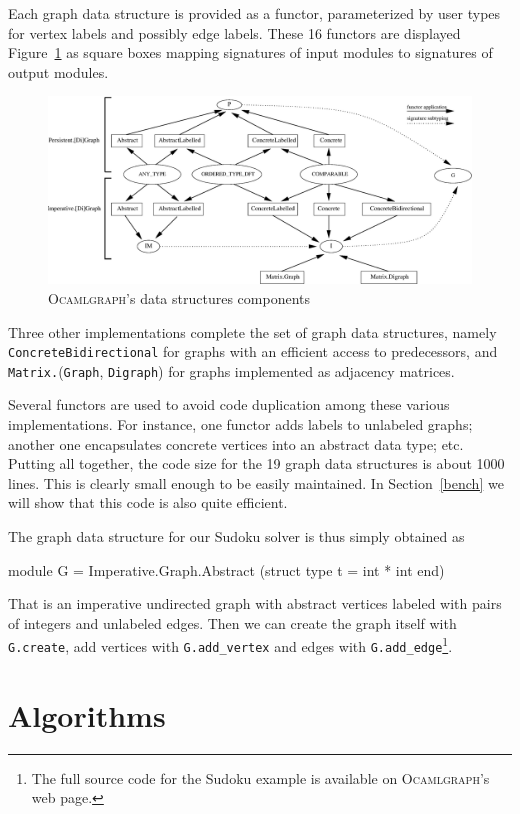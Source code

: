 \documentclass[tfpsymp]{tfp05symp}
\newcommand{\ocamlgraph}{\textsc{Ocamlgraph}\xspace}
\begin{document}
Each graph data structure is provided as a
functor, parameterized by user types for vertex labels and possibly edge
labels. These 16 
functors are displayed Figure~\ref{fig:interfaces} as square boxes
mapping signatures of input modules to signatures of output modules.
\begin{figure}
  \centering
  \includegraphics[width=\textwidth]{interface.eps} 
  \caption{\ocamlgraph's data structures components}\label{fig:interfaces}
\end{figure}
Three other implementations complete the set of graph data structures,
namely \texttt{ConcreteBidirectional} for graphs with an efficient
access to predecessors, and
\texttt{Matrix.}(\texttt{Graph}, \texttt{Digraph}) for graphs
implemented as adjacency matrices.

Several functors are used to avoid code duplication among these
various implementations. For instance, one functor adds labels to
unlabeled graphs; another one encapsulates concrete vertices into an
abstract data type; etc.  Putting all together, the code size for the 19
graph data structures is about 1000 lines. This is clearly small
enough to be easily maintained. In Section~\ref{bench} we will show
that this code is also quite efficient.

The graph data structure for our Sudoku solver is thus simply obtained as
\begin{ocaml}
module G = Imperative.Graph.Abstract
             (struct type t = int * int end) 
\end{ocaml}
That is an imperative undirected graph with abstract vertices labeled
with pairs of integers and unlabeled edges.
Then we can create the graph itself with \texttt{G.create}, add
vertices with \texttt{G.add\_vertex} and edges with
\texttt{G.add\_edge}\footnote{The full source code for the Sudoku example is
  available on \ocamlgraph's web page.}.

\section{Algorithms}\label{algos}
\end{document}
